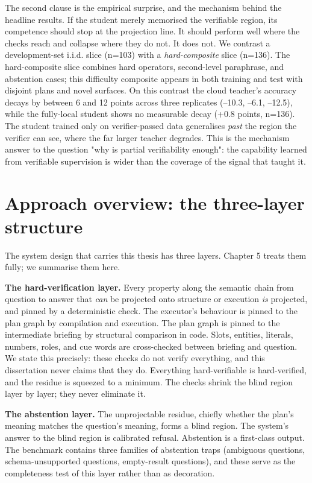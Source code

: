 \documentclass[10pt]{article} %
\begin{document}
The second clause is the empirical surprise, and the mechanism behind the headline results. If the student merely memorised the verifiable region, its competence should stop at the projection line. It should perform well where the checks reach and collapse where they do not. It does not. We contrast a development-set i.i.d. slice (n=103) with a \emph{hard-composite} slice (n=136). The hard-composite slice combines hard operators, second-level paraphrase, and abstention cases; this difficulty composite appears in both training and test with disjoint plans and novel surfaces. On this contrast the cloud teacher's accuracy decays by between 6 and 12 points across three replicates (--10.3, --6.1, --12.5), while the fully-local student shows no measurable decay (+0.8 points, n=136). The student trained only on verifier-passed data generalises \emph{past} the region the verifier can see, where the far larger teacher degrades. This is the mechanism answer to the question "why is partial verifiability enough": the capability learned from verifiable supervision is wider than the coverage of the signal that taught it.

\section{Approach overview: the three-layer structure}\label{sec:approach-overview-the-three-layer-struct}

The system design that carries this thesis has three layers. Chapter 5 treats them fully; we summarise them here.

\textbf{The hard-verification layer.} Every property along the semantic chain from question to answer that \emph{can} be projected onto structure or execution \emph{is} projected, and pinned by a deterministic check. The executor's behaviour is pinned to the plan graph by compilation and execution. The plan graph is pinned to the intermediate briefing by structural comparison in code. Slots, entities, literals, numbers, roles, and cue words are cross-checked between briefing and question. We state this precisely: these checks do not verify everything, and this dissertation never claims that they do. Everything hard-verifiable is hard-verified, and the residue is squeezed to a minimum. The checks shrink the blind region layer by layer; they never eliminate it.

\textbf{The abstention layer.} The unprojectable residue, chiefly whether the plan's meaning matches the question's meaning, forms a blind region. The system's answer to the blind region is calibrated refusal. Abstention is a first-class output. The benchmark contains three families of abstention traps (ambiguous questions, schema-unsupported questions, empty-result questions), and these serve as the completeness test of this layer rather than as decoration.
\end{document}
